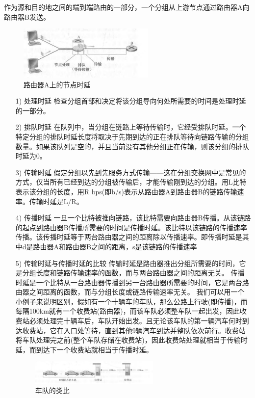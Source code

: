     作为源和目的地之间的端到端路由的一部分，一个分组从上游节点通过路由器A向路由器B发送。

\begin{figure}[!htbp]
    \centering
    \includegraphics[width=0.6\textwidth]{image/chapter01/时延类型.png}
    \caption{路由器A上的节点时延}
\end{figure}

\begin{itemize}
    \item [1)] 处理时延
    \subitem 检查分组首部和决定将该分组导向何处所需要的时间是处理时延的一部分。 
    \item [2)] 排队时延
    \subitem 在队列中，当分组在链路上等待传输时，它经受排队时延。一个特定分组的排队时延长度将取决于先期到达的正在排队等待向链路传输的分组数量。如果该队列是空的，并且当前没有其他分组正在传输，则该分组的排队时延为0。
    \item [3)] 传输时延
    \subitem 假定分组以先到先服务方式传输——这在分组交换网中是常见的方式，仅当所有已经到达的分组被传输后，才能传输刚到达的分组。用L比特表示该分组的长度，用R bps(即b/s)表示从路由器A到路由器B的链路传输速率。传输时延是L/R。
    \item [4)] 传播时延
    \subitem 一旦一个比特被推向链路，该比特需要向路由器B传播。从该链路的起点到路由器B传播所需要的时间是传播时延。该比特以该链路的传播速率传播。该传播时延等于两台路由器之间的距离除以传播速率。即传播时延是其中d是路由器A和路由器B之间的距离，s是该链路的传播速率
    \item [5)] 传输时延与传播时延的比较
    \subitem 传输时延是路由器推出分组所需要的时间，它是分组长度和链路传输速率的函数，而与两台路由器之间的距离无关。
    \subitem 传播时延是一个比特从一台路由器传播到另一台路由器所需要的时间，它是两台路由器之间距离的函数，而与分组长度或链路传输速率无关。
    \subitem 我们可以用一个小例子来说明区别，假如有一个十辆车的车队，那么公路上行驶(即传播)，而每隔100km就有一个收费站(路由器)，而该车队必须整车队一起出发，因此收费站必须处理完十辆车后，车队开始出发。且无论该车队的第一辆汽车何时到达收费站，它在入口处等待，直到其他9辆汽车到达并整队依次前行。收费站将车队处理完之前(整个车队存储在收费站)，因此收费站处理就相当于传输时延，而到达下一个收费站就相当于传播时延。
    \begin{figure}[!htbp]
        \centering
        \includegraphics[width=0.6\textwidth]{image/chapter01/收费站类比.png}
        \caption{车队的类比}
    \end{figure}
\end{itemize}

